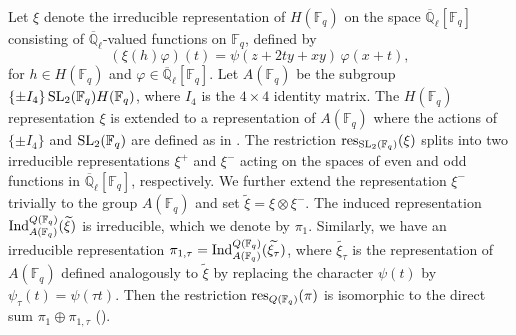\documentclass[10pt, reqno]{amsart}
\theoremstyle{plain}
\numberwithin{equation}{section} \newcommand{\di}{\operatorname{dim}}
\begin{document}
\subsubsection{}
Let $\xi$ denote the irreducible representation of $H(\mathbb{F}_q)$
on the space $\overline{\mathbb{Q}}_\ell[\mathbb{F}_q]$ consisting of
$\overline{\mathbb{Q}}_\ell$-valued functions on $\mathbb{F}_q$,
defined by
\begin{equation}\label{action_unipotent}
(\xi(h)\varphi)(t) = \psi(z+2ty+xy)\,
\varphi(x+t),
\end{equation}
for $h\in H(\mathbb{F}_q)$ and
$\varphi \in \overline{\mathbb{Q}}_\ell [\mathbb{F}_q]$. Let
$A(\mathbb{F}_q)$ be the subgroup
$\{\pm I_4\}\,{\rm SL}_2(\mathbb{F}_q) H(\mathbb{F}_q)$, where $I_4$
is the $4\times 4$ identity matrix. The $H(\mathbb{F}_q)$
representation $\xi$ is extended to a representation of
$A(\mathbb{F}_q)$ where the actions of $\{\pm I_4\}$ and
${\rm SL}_2(\mathbb{F}_q)$ are defined as in \cite[equations $(1)$ and
$(2)$]{Golfand_Sp4}. The restriction
${\rm res}_{{\rm SL}_2(\mathbb{F}_q)}(\xi)$ splits into two
irreducible representations $\xi^{+}$ and $\xi^{-}$ acting on the
spaces of even and odd functions in
$\overline{\mathbb{Q}}_\ell[\mathbb{F}_q]$, respectively. We further
extend the representation $\xi^{-}$ trivially to the group
$A(\mathbb{F}_q)$ and set $\widetilde{\xi} = \xi\otimes \xi^{-}$.  The
induced representation
${\rm Ind}_{A(\mathbb{F}_q)}^{Q(\mathbb{F}_q)} (\widetilde{\xi})$ is
irreducible, which we denote by $\pi_1$.  Similarly, we have an
irreducible representation
$\pi_{1,\tau} = {\rm Ind}_{A(\mathbb{F}_q)}^{Q(\mathbb{F}_q)}
(\widetilde{\xi_\tau})$, where $\widetilde{\xi_\tau}$ is the
representation of $A(\mathbb{F}_q)$ defined analogously to
$\widetilde{\xi}$ by replacing the character $\psi(t)$ by
$\psi_\tau(t) = \psi(\tau t)$. Then the restriction
${\rm res}_{Q(\mathbb{F}_q)}(\pi)$ is isomorphic to the direct sum
$\pi_1 \oplus \pi_{1,\tau}$ (\cite[Proposition 2]{Golfand_Sp4}).
\end{document}
